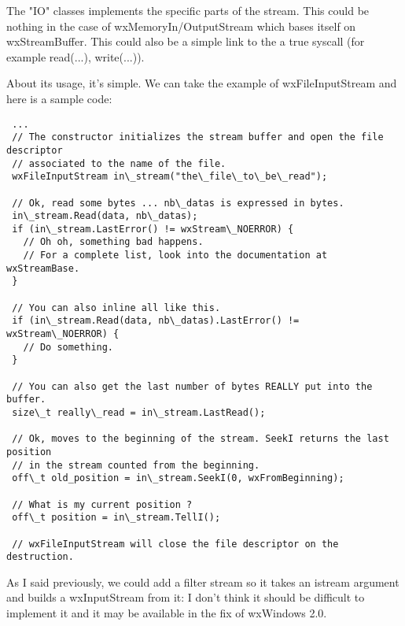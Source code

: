 The "IO" classes implements the specific parts of the stream. This could be
nothing in the case of wxMemoryIn/OutputStream which bases itself on
wxStreamBuffer. This could also be a simple link to the a true syscall
(for example read(...), write(...)).


About its usage, it's simple. We can take the example of wxFileInputStream and here is a sample
code:

\begin{verbatim}
 ...
 // The constructor initializes the stream buffer and open the file descriptor
 // associated to the name of the file.
 wxFileInputStream in\_stream("the\_file\_to\_be\_read");

 // Ok, read some bytes ... nb\_datas is expressed in bytes.
 in\_stream.Read(data, nb\_datas);
 if (in\_stream.LastError() != wxStream\_NOERROR) {
   // Oh oh, something bad happens.
   // For a complete list, look into the documentation at wxStreamBase.
 }

 // You can also inline all like this.
 if (in\_stream.Read(data, nb\_datas).LastError() != wxStream\_NOERROR) {
   // Do something.
 }

 // You can also get the last number of bytes REALLY put into the buffer.
 size\_t really\_read = in\_stream.LastRead();

 // Ok, moves to the beginning of the stream. SeekI returns the last position 
 // in the stream counted from the beginning.
 off\_t old_position = in\_stream.SeekI(0, wxFromBeginning);
 
 // What is my current position ?
 off\_t position = in\_stream.TellI();

 // wxFileInputStream will close the file descriptor on the destruction.
\end{verbatim}


As I said previously, we could add a filter stream so it takes an istream
argument and builds a wxInputStream from it: I don't think it should 
be difficult to implement it and it may be available in the fix of wxWindows 2.0.
